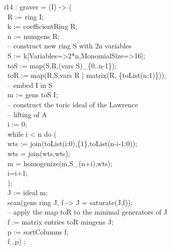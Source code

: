 \beginOutput
i14 : graver = (I) -> (\\
\          R := ring I;\\
\          k := coefficientRing R;\\
\          n := numgens R;\\
\          -- construct new ring S with 2n variables\\
\          S := k[Variables=>2*n,MonomialSize=>16];\\
\          toS := map(S,R,(vars S)_\{0..n-1\});\\
\          toR := map(R,S,vars R | matrix(R, \{toList(n:1)\}));\\
\          -- embed I in S\\
\          m := gens toS I;\\
\          -- construct the toric ideal of the Lawrence \\
\          -- lifting of A\\
\          i := 0;\\
\          while i < n do (\\
\              wts := join(toList(i:0),\{1\},toList(n-i-1:0));\\
\              wts = join(wts,wts);\\
\              m = homogenize(m,S_(n+i),wts);\\
\              i=i+1;\\
\              );\\
\         J := ideal m;\\
\         scan(gens ring J, f -> J = saturate(J,f));\\
\         -- apply the map toR to the minimal generators of J \\
\         f := matrix entries toR mingens J;\\
\         p := sortColumns f;\\
\         f_p) ;  \\
\endOutput
   
